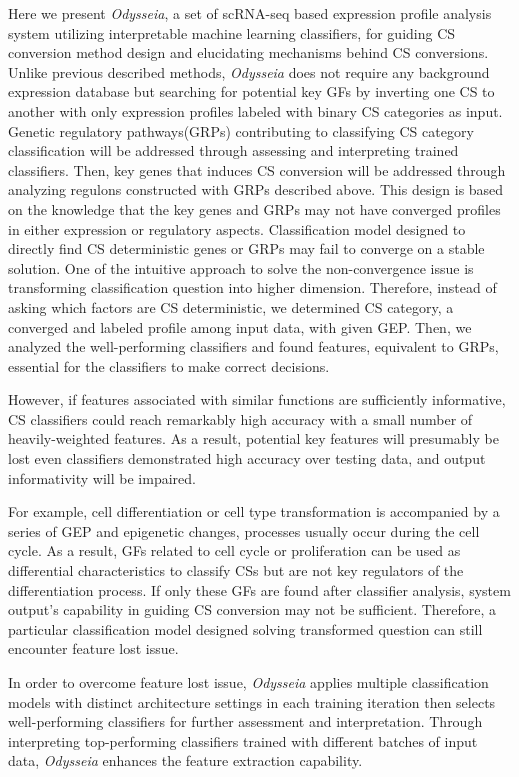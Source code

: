 \documentclass[fleqn,10pt]{wlscirep}
\begin{document}
Here we present \emph{Odysseia}, a set of scRNA-seq based expression profile analysis system utilizing interpretable machine learning classifiers, for  guiding CS conversion method design and elucidating mechanisms behind CS conversions.
Unlike previous described methods, \emph{Odysseia} does not require any background expression database but searching for potential key GFs by inverting one CS to another with only expression profiles labeled with binary CS categories as input.
Genetic regulatory pathways(GRPs) contributing to classifying CS category classification will be addressed through assessing and interpreting trained classifiers.
Then, key genes that induces CS conversion will be addressed through analyzing regulons constructed with GRPs described above.
This design is based on the knowledge that the key genes and GRPs may not have converged profiles in either expression or regulatory aspects.
Classification model designed to directly find CS deterministic genes or GRPs may fail to converge on a stable solution.
One of the intuitive approach to solve the non-convergence issue is transforming classification question into higher dimension.
Therefore, instead of asking which factors are CS deterministic, we determined CS category, a converged and labeled profile among input data, with given GEP.
Then, we analyzed the well-performing classifiers and found features, equivalent to GRPs, essential for the classifiers to make correct decisions.

However, if features associated with similar functions are sufficiently informative, CS classifiers could reach remarkably high accuracy with a small number of heavily-weighted features.
As a result, potential key features will presumably be lost even classifiers demonstrated high accuracy over testing data, and output informativity will be impaired.

For example, cell differentiation or cell type transformation is accompanied by a series of GEP and epigenetic changes, processes usually occur during the cell cycle.\cite{dalton_2015, engstrom_2021}
As a result, GFs related to cell cycle or proliferation can be used as differential characteristics to classify CSs but are not key regulators of the differentiation process.
If only these GFs are found after classifier analysis, system output's capability in guiding CS conversion may not be sufficient.
Therefore, a particular classification model designed solving transformed question can still encounter feature lost issue.

In order to overcome feature lost issue, \emph{Odysseia} applies multiple classification models with distinct architecture settings in each training iteration then selects well-performing classifiers for further assessment and interpretation.
Through interpreting top-performing classifiers trained with different batches of input data, \emph{Odysseia} enhances the feature extraction capability.
\end{document}
